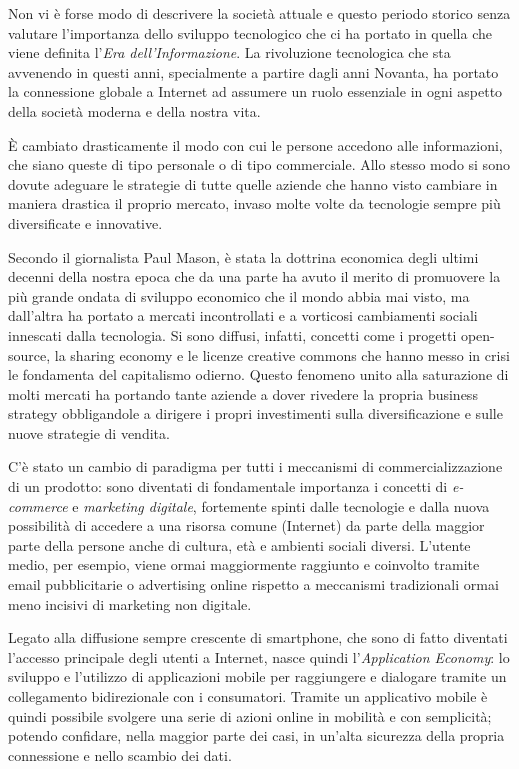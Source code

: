 Non vi è forse modo di descrivere la società attuale e questo periodo
storico senza valutare l'importanza dello sviluppo tecnologico che
ci ha portato in quella che viene definita l'\textit{Era dell'Informazione}.
La rivoluzione tecnologica che sta avvenendo in questi anni, specialmente
a partire dagli anni Novanta, ha portato la connessione globale a
Internet ad assumere un ruolo essenziale in ogni aspetto della società
moderna e della nostra vita.\bigskip{}

È cambiato drasticamente il modo con cui le persone accedono alle
informazioni, che siano queste di tipo personale o di tipo commerciale.
Allo stesso modo si sono dovute adeguare le strategie di tutte quelle
aziende che hanno visto cambiare in maniera drastica il proprio mercato,
invaso molte volte da tecnologie sempre più diversificate e innovative.\bigskip{}

Secondo il giornalista Paul Mason, è stata la dottrina economica degli
ultimi decenni della nostra epoca che da una parte ha avuto il merito
di promuovere la più grande ondata di sviluppo economico che il mondo
abbia mai visto, ma dall’altra ha portato a mercati incontrollati
e a vorticosi cambiamenti sociali innescati dalla tecnologia. Si sono
diffusi, infatti, concetti come i progetti open-source, la sharing
economy e le licenze creative commons che hanno messo in crisi le
fondamenta del capitalismo odierno. Questo fenomeno unito alla saturazione
di molti mercati ha portando tante aziende a dover rivedere la propria
business strategy obbligandole a dirigere i propri investimenti sulla
diversificazione e sulle nuove strategie di vendita. \cite{POSTCAPITALISMO}

\bigskip{}

C'è stato un cambio di paradigma per tutti i meccanismi di commercializzazione
di un prodotto: sono diventati di fondamentale importanza i concetti
di \emph{e-commerce} e \emph{marketing digitale}, fortemente spinti
dalle tecnologie e dalla nuova possibilità di accedere a una risorsa
comune (Internet) da parte della maggior parte della persone anche
di cultura, età e ambienti sociali diversi. L'utente medio, per esempio,
viene ormai maggiormente raggiunto e coinvolto tramite email pubblicitarie
o advertising online rispetto a meccanismi tradizionali ormai meno
incisivi di marketing non digitale.

\bigskip{}

Legato alla diffusione sempre crescente di smartphone, che sono di
fatto diventati l'accesso principale degli utenti a Internet, nasce
quindi l'\textit{Application Economy}: lo sviluppo e l'utilizzo di
applicazioni mobile per raggiungere e dialogare tramite un collegamento
bidirezionale con i consumatori. Tramite un applicativo mobile è quindi
possibile svolgere una serie di azioni online in mobilità e con semplicità;
potendo confidare, nella maggior parte dei casi, in un'alta sicurezza
della propria connessione e nello scambio dei dati.\bigskip{}

